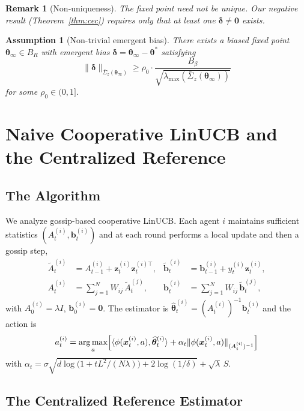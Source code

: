 \documentclass[11pt]{article}
\newtheorem{assumption}[theorem]{Assumption}
\newtheorem*{remark}{Remark}
\DeclareMathOperator*{\argmax}{arg\,max}
\begin{document}
\begin{remark}[Non-uniqueness]\label{rem:nonunique}
The fixed point need not be unique.  Our negative result
(Theorem~\ref{thm:cec}) requires only that at least one
$\bm{\delta}\neq\bm{0}$ exists.
\end{remark}

\begin{assumption}[Non-trivial emergent bias]\label{ass:bias}
There exists a biased fixed point $\bm{\theta}_\infty\in B_R$ with
emergent bias
$\bm{\delta}=\bm{\theta}_\infty-\bm{\theta}^{\!*}$ satisfying
\[
\|\bm{\delta}\|_{\bar{\Sigma}_z(\bm{\theta}_\infty)}
\geq\rho_0\cdot\frac{B_\beta}{\sqrt{\lambda_{\max}(\bar{\Sigma}_z(\bm{\theta}_\infty))}}
\]
for some $\rho_0\in(0,1]$.
\end{assumption}


\section{Naive Cooperative LinUCB and the Centralized Reference}
\label{sec:naive}

\subsection{The Algorithm}

We analyze gossip-based cooperative LinUCB.  Each agent $i$ maintains
sufficient statistics $(A_t^{(i)},\bm{b}_t^{(i)})$ and at each round
performs a local update and then a gossip step,
\begin{align*}
\widetilde{A}_t^{(i)}&=A_{t-1}^{(i)}+\bm{z}_t^{(i)}\bm{z}_t^{(i)\top},&
\widetilde{\bm{b}}_t^{(i)}&=\bm{b}_{t-1}^{(i)}+y_t^{(i)}\bm{z}_t^{(i)},\\
A_t^{(i)}&=\sum_{j=1}^N W_{ij}\,\widetilde{A}_t^{(j)},&
\bm{b}_t^{(i)}&=\sum_{j=1}^N W_{ij}\,\widetilde{\bm{b}}_t^{(j)},
\end{align*}
with $A_0^{(i)}=\lambda I$, $\bm{b}_0^{(i)}=\bm{0}$.
The estimator is
$\widehat{\bm{\theta}}_t^{(i)}=(A_t^{(i)})^{-1}\bm{b}_t^{(i)}$
and the action is
\[
a_t^{(i)}=\argmax_a\Bigl[\langle\phi(\bm{x}_t^{(i)},a),
\widehat{\bm{\theta}}_t^{(i)}\rangle
+\alpha_t\|\phi(\bm{x}_t^{(i)},a)\|_{(A_t^{(i)})^{-1}}\Bigr]
\]
with $\alpha_t=\sigma\sqrt{d\log\!\bigl(1+tL^2/(N\lambda)\bigr)+2\log(1/\delta)}
+\sqrt{\lambda}\,S$.

\subsection{The Centralized Reference Estimator}
\end{document}
